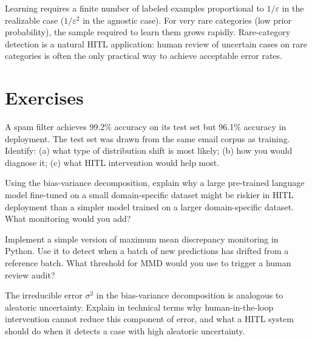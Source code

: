 \begin{keyconcept}
Learning requires a finite number of labeled examples proportional to $1/\varepsilon$ in the realizable case ($1/\varepsilon^2$ in the agnostic case). For very rare categories (low prior probability), the sample required to learn them grows rapidly. Rare-category detection is a natural HITL application: human review of uncertain cases on rare categories is often the only practical way to achieve acceptable error rates.
\end{keyconcept}

\section{Exercises}

\begin{Exercise}
A spam filter achieves 99.2\% accuracy on its test set but 96.1\% accuracy in deployment. The test set was drawn from the same email corpus as training. Identify: (a) what type of distribution shift is most likely; (b) how you would diagnose it; (c) what HITL intervention would help most.
\end{Exercise}

\begin{Exercise}
Using the bias-variance decomposition, explain why a large pre-trained language model fine-tuned on a small domain-specific dataset might be riskier in HITL deployment than a simpler model trained on a larger domain-specific dataset. What monitoring would you add?
\end{Exercise}

\begin{Exercise}
Implement a simple version of maximum mean discrepancy monitoring in Python. Use it to detect when a batch of new predictions has drifted from a reference batch. What threshold for MMD would you use to trigger a human review audit?
\end{Exercise}

\begin{Exercise}
The irreducible error $\sigma^2$ in the bias-variance decomposition is analogous to aleatoric uncertainty. Explain in technical terms why human-in-the-loop intervention cannot reduce this component of error, and what a HITL system should do when it detects a case with high aleatoric uncertainty.
\end{Exercise}

